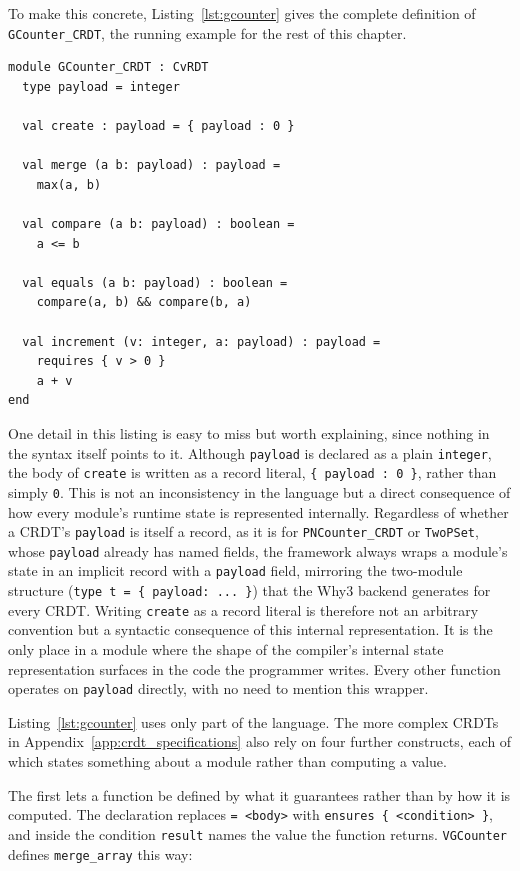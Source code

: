 To make this concrete, Listing~\ref{lst:gcounter} gives the complete definition of \texttt{GCounter\_CRDT}, the running
example for the rest of this chapter.

\begin{lstlisting}[caption={GCounter\_CRDT module}, label={lst:gcounter}]
module GCounter_CRDT : CvRDT
  type payload = integer

  val create : payload = { payload : 0 }

  val merge (a b: payload) : payload =
    max(a, b)

  val compare (a b: payload) : boolean =
    a <= b

  val equals (a b: payload) : boolean =
    compare(a, b) && compare(b, a)

  val increment (v: integer, a: payload) : payload =
    requires { v > 0 }
    a + v
end
\end{lstlisting}

One detail in this listing is easy to miss but worth explaining, since nothing in the syntax itself points to it.
Although \texttt{payload} is declared as a plain \texttt{integer}, the body of \texttt{create} is written as a record
literal, \texttt{\{ payload : 0 \}}, rather than simply \texttt{0}. This is not an inconsistency in the language but a
direct consequence of how every module's runtime state is represented internally. Regardless of whether a CRDT's
\texttt{payload} is itself a record, as it is for \texttt{PNCounter\_CRDT} or \texttt{TwoPSet}, whose \texttt{payload}
already has named fields, the framework always wraps a module's state in an implicit record with a \texttt{payload} field,
mirroring the two-module structure (\texttt{type t = \{ payload: ... \}}) that the Why3 backend generates for every CRDT.
Writing \texttt{create} as a record literal is therefore not an arbitrary convention but a syntactic consequence of this
internal representation. It is the only place in a module where the shape of the compiler's internal state representation
surfaces in the code the programmer writes. Every other function operates on \texttt{payload} directly, with no need to
mention this wrapper.

Listing~\ref{lst:gcounter} uses only part of the language. The more complex CRDTs in Appendix~\ref{app:crdt_specifications}
also rely on four further constructs, each of which states something about a module rather than computing a value.

The first lets a function be defined by what it guarantees rather than by how it is computed. The declaration replaces
\texttt{= <body>} with \texttt{ensures \{ <condition> \}}, and inside the condition \texttt{result} names the value the
function returns. \texttt{VGCounter} defines \texttt{merge\_array} this way:

